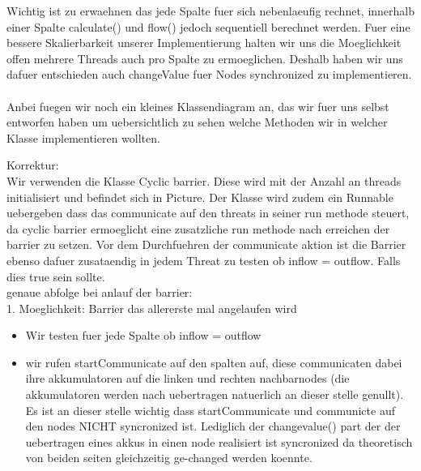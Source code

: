 \documentclass[12pt]{article}
\begin{document}
Wichtig ist zu erwaehnen das jede Spalte fuer sich nebenlaeufig rechnet, innerhalb einer Spalte calculate() und flow() jedoch sequentiell berechnet werden. Fuer eine bessere Skalierbarkeit unserer Implementierung halten wir uns die Moeglichkeit offen mehrere Threads auch pro Spalte zu ermoeglichen. Deshalb haben wir uns dafuer entschieden auch changeValue fuer Nodes synchronized zu implementieren.\\\\

Anbei fuegen wir noch ein kleines Klassendiagram an, das wir fuer uns selbst entworfen haben um uebersichtlich zu sehen welche Methoden wir in welcher Klasse implementieren wollten.

Korrektur:\\
Wir verwenden die Klasse Cyclic barrier. Diese wird mit der Anzahl an threads initialisiert und befindet sich in Picture. Der Klasse wird zudem ein Runnable uebergeben dass das communicate auf den threats in seiner run methode steuert, da cyclic barrier ermoeglicht eine zusatzliche run methode nach erreichen der barrier zu setzen. Vor dem Durchfuehren der communicate aktion ist die Barrier ebenso dafuer zusataendig in jedem Threat zu testen ob inflow = outflow. Falls dies true sein sollte.\\


genaue abfolge bei anlauf der barrier:\\
1. Moeglichkeit: Barrier das allererste mal angelaufen wird
\begin{itemize}
	\item Wir testen fuer jede Spalte ob inflow = outflow
	\item wir rufen startCommunicate auf den spalten auf, diese communicaten dabei ihre akkumulatoren auf die linken und rechten nachbarnodes (die akkumulatoren werden nach uebertragen natuerlich an dieser stelle genullt). Es ist an dieser stelle wichtig dass startCommunicate und communicte auf den nodes NICHT syncronized ist. Lediglich der changevalue() part der der uebertragen eines akkus in einen node realisiert ist syncronized da theoretisch von beiden seiten gleichzeitig ge-changed werden koennte.

\end{itemize}

\newpage
\end{document}
